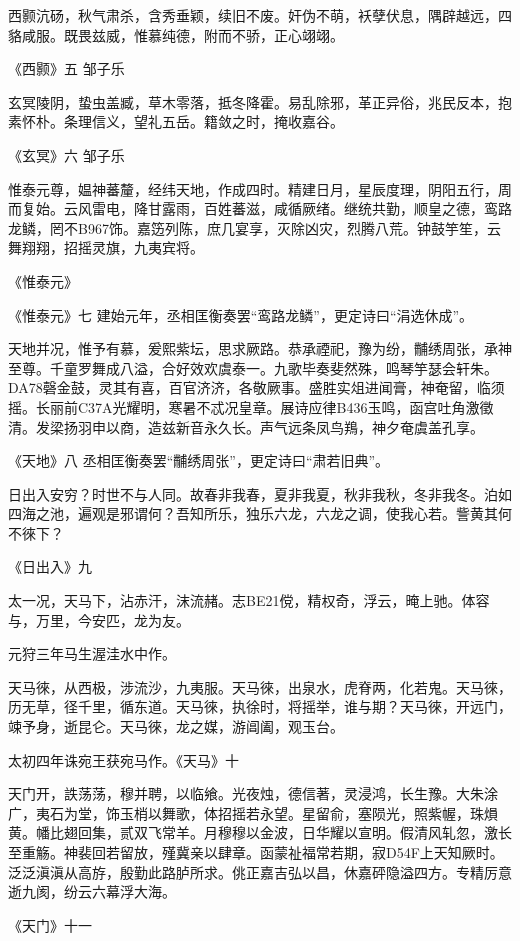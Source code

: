 \documentclass[]{article}
\begin{document}
西颢沆砀，秋气肃杀，含秀垂颖，续旧不废。奸伪不萌，袄孽伏息，隅辟越远，四貉咸服。既畏兹威，惟慕纯德，附而不骄，正心翊翊。

《西颢》五 邹子乐

玄冥陵阴，蛰虫盖臧，草木零落，抵冬降霍。易乱除邪，革正异俗，兆民反本，抱素怀朴。条理信义，望礼五岳。籍敛之时，掩收嘉谷。

《玄冥》六 邹子乐

惟泰元尊，媪神蕃釐，经纬天地，作成四时。精建日月，星辰度理，阴阳五行，周而复始。云风雷电，降甘露雨，百姓蕃滋，咸循厥绪。继统共勤，顺皇之德，鸾路龙鳞，罔不B967饰。嘉笾列陈，庶几宴享，灭除凶灾，烈腾八荒。钟鼓竽笙，云舞翔翔，招摇灵旗，九夷宾将。

《惟泰元》

《惟泰元》七 建始元年，丞相匡衡奏罢``鸾路龙鳞''，更定诗曰``涓选休成''。

天地并况，惟予有慕，爰熙紫坛，思求厥路。恭承禋祀，豫为纷，黼绣周张，承神至尊。千童罗舞成八溢，合好效欢虞泰一。九歌毕奏斐然殊，鸣琴竽瑟会轩朱。DA78磬金鼓，灵其有喜，百官济济，各敬厥事。盛胜实俎进闻膏，神奄留，临须摇。长丽前C37A光耀明，寒暑不忒况皇章。展诗应律B436玉鸣，函宫吐角激徵清。发梁扬羽申以商，造兹新音永久长。声气远条凤鸟鴹，神夕奄虞盖孔享。

《天地》八 丞相匡衡奏罢``黼绣周张''，更定诗曰``肃若旧典''。

日出入安穷？时世不与人同。故春非我春，夏非我夏，秋非我秋，冬非我冬。泊如四海之池，遍观是邪谓何？吾知所乐，独乐六龙，六龙之调，使我心若。訾黄其何不徠下？

《日出入》九

太一况，天马下，沾赤汗，沫流赭。志BE21傥，精权奇，浮云，晻上驰。体容与，万里，今安匹，龙为友。

元狩三年马生渥洼水中作。

天马徠，从西极，涉流沙，九夷服。天马徠，出泉水，虎脊两，化若鬼。天马徠，历无草，径千里，循东道。天马徠，执徐时，将摇举，谁与期？天马徠，开远门，竦予身，逝昆仑。天马徠，龙之媒，游阊阖，观玉台。

太初四年诛宛王获宛马作。《天马》十

天门开，詄荡荡，穆并聘，以临飨。光夜烛，德信著，灵浸鸿，长生豫。大朱涂广，夷石为堂，饰玉梢以舞歌，体招摇若永望。星留俞，塞陨光，照紫幄，珠熉黄。幡比翅回集，贰双飞常羊。月穆穆以金波，日华耀以宣明。假清风轧忽，激长至重觞。神裴回若留放，殣冀亲以肆章。函蒙祉福常若期，寂D54F上天知厥时。泛泛滇滇从高斿，殷勤此路胪所求。佻正嘉吉弘以昌，休嘉砰隐溢四方。专精厉意逝九阂，纷云六幕浮大海。

《天门》十一
\end{document}
